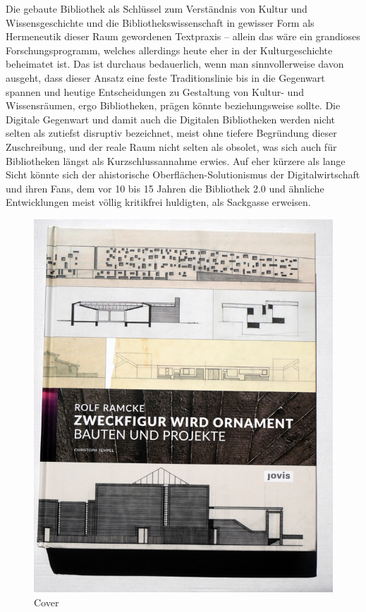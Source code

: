 \documentclass[a4paper,
fontsize=11pt,
oneside,
numbers=noperiodatend,
parskip=half-,
bibliography=totoc,
final
]{scrartcl}
\begin{document}
Die gebaute Bibliothek als Schlüssel zum Verständnis von Kultur und
Wissensgeschichte und die Bibliothekswissenschaft in gewisser Form als
Hermeneutik dieser Raum gewordenen Textpraxis -- allein das wäre ein
grandioses Forschungsprogramm, welches allerdings heute eher in der
Kulturgeschichte beheimatet ist. Das ist durchaus bedauerlich, wenn man
sinnvollerweise davon ausgeht, dass dieser Ansatz eine feste
Traditionslinie bis in die Gegenwart spannen und heutige Entscheidungen
zu Gestaltung von Kultur- und Wissensräumen, ergo Bibliotheken, prägen
könnte beziehungsweise sollte. Die Digitale Gegenwart und damit auch die
Digitalen Bibliotheken werden nicht selten als zutiefst disruptiv
bezeichnet, meist ohne tiefere Begründung dieser Zuschreibung, und der
reale Raum nicht selten als obsolet, was sich auch für Bibliotheken
längst als Kurzschlussannahme erwies. Auf eher kürzere als lange Sicht
könnte sich der ahistorische Oberflächen-Solutionismus der
Digitalwirtschaft und ihren Fans, dem vor 10 bis 15 Jahren die
Bibliothek 2.0 und ähnliche Entwicklungen meist völlig kritikfrei
huldigten, als Sackgasse erweisen.

\begin{figure}[htbp]
\centering
\includegraphics{img/cover-ramcke.jpg}
\caption{Cover}
\end{figure}
\end{document}
